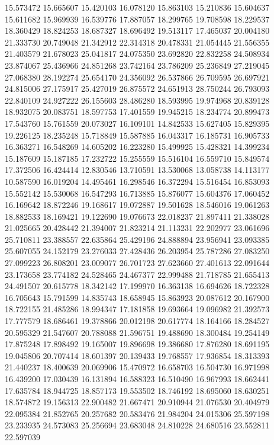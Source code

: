 15.573472
15.665607
15.420103
16.078120
15.863103
15.210836
15.604637
15.611682
15.969939
16.539776
17.887057
18.299765
19.708598
18.229537
18.360429
18.824253
18.687327
18.696492
19.513117
17.465037
20.004180
21.333730
20.749048
21.342912
22.314318
20.478331
21.054445
21.556355
21.403579
21.678023
25.041817
24.075350
23.692820
22.832258
24.508934
23.874067
25.436966
24.851268
23.742164
23.786209
25.236849
27.219045
27.068380
28.192274
25.654170
24.356092
26.537866
26.709595
26.697921
24.815006
27.175917
25.427019
26.875572
24.651913
28.750244
26.793093
22.840109
24.927222
26.155603
28.486280
18.593995
19.974968
20.839128
18.932075
20.083751
18.597753
17.401559
19.945215
18.234774
20.899473
17.543760
15.761559
20.073027
16.109101
14.842533
15.627405
15.829395
19.226125
18.235248
15.718849
15.587885
16.043317
16.185731
16.905733
16.363271
16.548269
14.605202
16.223280
15.499925
15.428321
14.399234
15.187609
15.187185
17.232722
15.255559
15.516104
16.559710
15.849574
17.372506
16.424414
12.830546
13.710591
13.530068
13.058738
14.113177
10.587590
16.019204
14.495461
16.298546
16.372294
15.516454
16.853093
15.552142
15.530068
16.547293
16.713885
15.876077
15.604376
17.060452
16.169642
18.872246
19.168617
19.072887
19.501628
18.546016
19.061263
18.882533
18.169421
19.122690
19.076673
22.018237
21.897411
21.338028
21.025665
20.428442
21.394007
21.823214
21.113231
22.202977
23.061696
25.710811
23.388557
22.635864
25.429196
24.888894
23.956941
23.093385
25.607055
24.152179
23.276033
27.428436
26.203954
25.787286
27.083250
27.099223
26.808201
23.009077
26.701723
27.623660
27.401613
22.091644
23.173658
23.774182
24.528465
24.467377
22.999488
21.718785
21.655413
24.491507
20.615778
18.342142
17.199970
16.363138
16.694626
18.722328
16.705643
15.791599
14.835743
18.658945
15.863923
20.087612
20.167900
18.722155
21.485286
18.994347
17.181858
19.693664
19.096982
21.392573
17.777579
18.686461
19.378866
20.012198
20.617774
18.164166
18.284527
20.595329
21.547607
20.788088
21.596751
19.488690
18.300484
19.254149
17.875248
17.898492
19.165007
19.896698
19.386680
17.876280
18.691195
19.045806
20.707414
18.601397
20.139433
19.768557
17.936854
18.313393
21.440237
18.400639
20.069906
15.470972
16.658703
16.504730
16.971998
16.439200
17.030439
16.131894
16.588323
16.510490
16.967993
18.662441
17.635784
18.944725
18.857173
19.553502
18.746192
18.695060
18.630251
18.574872
19.156313
22.900482
21.667471
20.910944
21.076530
20.404979
22.095384
21.852765
20.257682
20.583476
21.984204
24.015306
25.597198
23.233935
24.573083
25.256694
23.683048
24.810228
24.680516
23.552811
22.597039
